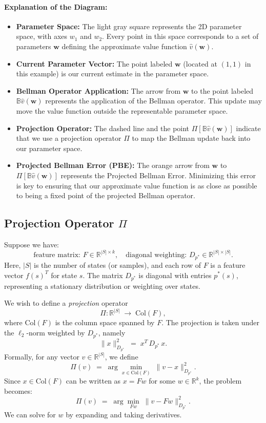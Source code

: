 \paragraph{Explanation of the Diagram:}
\begin{itemize}
    \item \textbf{Parameter Space:} The light gray square represents the 2D parameter space, with axes $w_1$ and $w_2$. Every point in this space corresponds to a set of parameters $\mathbf{w}$ defining the approximate value function $\hat{v}(\mathbf{w})$.
    \item \textbf{Current Parameter Vector:} The point labeled $\mathbf{w}$ (located at $(1,1)$ in this example) is our current estimate in the parameter space.
    \item \textbf{Bellman Operator Application:} The arrow from $\mathbf{w}$ to the point labeled $\mathbb{B}\hat{v}(\mathbf{w})$ represents the application of the Bellman operator. This update may move the value function outside the representable parameter space.
    \item \textbf{Projection Operator:} The dashed line and the point $\Pi[\mathbb{B}\hat{v}(\mathbf{w})]$ indicate that we use a projection operator $\Pi$ to map the Bellman update back into our parameter space.
    \item \textbf{Projected Bellman Error (PBE):} The orange arrow from $\mathbf{w}$ to $\Pi[\mathbb{B}\hat{v}(\mathbf{w})]$ represents the Projected Bellman Error. Minimizing this error is key to ensuring that our approximate value function is as close as possible to being a fixed point of the projected Bellman operator.
\end{itemize}

\subsection{Projection Operator \texorpdfstring{$\Pi$}{Pi}}

Suppose we have:
\[
\text{feature matrix: } F \in \mathbb{R}^{|S|\times k}, 
\quad
\text{diagonal weighting: } D_{p^*} \in \mathbb{R}^{|S|\times |S|}.
\]
Here, $|S|$ is the number of states (or samples), and each row of $F$ is a feature vector $f(s)^T$ for state $s$. The matrix $D_{p^*}$ is diagonal with entries $p^*(s)$, representing a stationary distribution or weighting over states.

We wish to define a \emph{projection} operator
\[
\Pi: \mathbb{R}^{|S|} \;\to\; \text{Col}(F),
\]
where $\text{Col}(F)$ is the column space spanned by $F$. The projection is taken under the $\ell_2$-norm weighted by $D_{p^*}$, namely
\[
\|x\|_{D_{p^*}}^2 \;=\; x^T\,D_{p^*}\,x.
\]
Formally, for any vector $v \in \mathbb{R}^{|S|}$, we define
\[
\Pi(v) \;=\; \arg\min_{x \in \text{Col}(F)} \;\|v - x\|_{D_{p^*}}^2.
\]
Since $x \in \text{Col}(F)$ can be written as $x = Fw$ for some $w \in \mathbb{R}^k$, the problem becomes:
\[
\Pi(v) 
\;=\; \arg\min_{Fw} \;\|v - Fw\|_{D_{p^*}}^2.
\]
We can solve for $w$ by expanding and taking derivatives.

